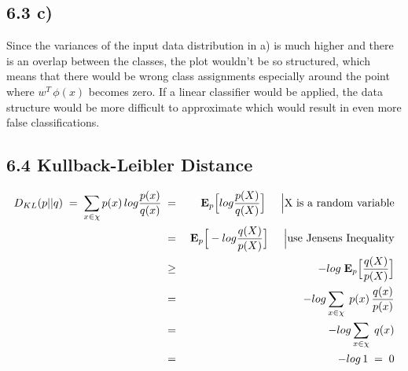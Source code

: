 \documentclass[11pt,a4paper]{article}
\begin{document}
\pagestyle{fancy}

\subsection*{6.3 c)}

Since the variances of the input data distribution in a) is much higher and there is an overlap between the classes, the plot wouldn't be so structured, which means
that there would be wrong class assignments especially around the point where $w^T\,\phi(x)$ becomes zero. If a linear classifier would be applied, the data structure
would be more difficult to approximate which would result in even more false classifications.  

\subsection*{6.4 Kullback-Leibler Distance}

\begin{eqnarray}
D_{KL}(p||q)\;=\; \sum_{x \in \chi} p(x)\,log \frac{p(x)}{q(x)} &\;=\;& \mathbf{E}_p \Big{[} log \frac{p(X)}{q(X)} \Big{]} \;\;\;\;\; \Big{|} \mbox{X is a random variable} \\
&\;=\;& \mathbf{E}_p \Big{[} -log \frac{q(X)}{p(X)} \Big{]} \;\;\;\;\; \Big{|} \mbox{use Jensens Inequality}  \\
&\;\geq \;& -log\; \mathbf{E}_p \Big{[} \frac{q(X)}{p(X)} \Big{]} \\
&\;=\;& -log \sum_{x \in \chi}\;p(x)\, \frac{q(x)}{p(x)} \\
&\;=\;& -log \sum_{x \in \chi}\; q(x) \\
&\;=\;& -log\,1 \;=\; 0
\end{eqnarray}
\end{document}
